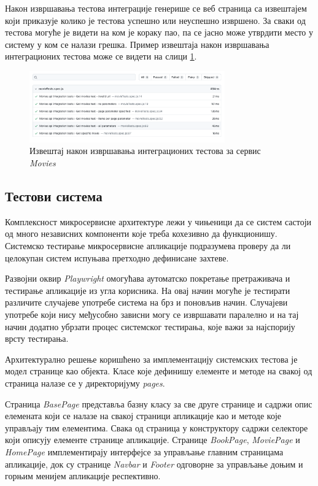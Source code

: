 \documentclass[12pt,oneside]{memoir}
\begin{document}
Након извршавања тестова интеграције генерише се веб страница са извештајем који приказује колико је тестова успешно или неуспешно извршено. За сваки од тестова могуће је видети на ком је кораку пао, па се јасно може утврдити место у систему у ком се налази грешка. Пример извештаја након извршавања интеграционих тестова може се видети на слици \ref{fig:integrationReport}. 

\begin{figure}[!ht]
  \centering
  \includegraphics[width=0.75\textwidth]{matfmaster/img/integrationReport.png}
  \caption{Извештај након извршавања интеграционих тестова за сервис \textit{Movies}}
  \label{fig:integrationReport}
\end{figure}
\newpage
\subsection{Тестови система}

Комплексност микросервисне архитектуре лежи у чињеници да се систем састоји од много независних компоненти које треба кохезивно да функционишу. Системско тестирање микросервисне апликације подразумева проверу да ли целокупан систем испуњава претходно дефинисане захтеве.

Развојни оквир \textit{Playwright} омогућава аутоматско покретање претраживача и тестирање апликације из угла корисника. На овај начин могуће је тестирати различите случајеве употребе система на брз и поновљив начин. Случајеви употребе који нису међусобно зависни могу се извршавати паралелно и на тај начин додатно убрзати процес системског тестирања, које важи за најспорију врсту тестирања.

Архитектурално решење коришћено за имплементацију системских тестова  је модел странице као објекта. Класе које дефинишу елементе и методе на свакој од страница налазе се у директоријуму \textit{pages}. 

Страница \textit{BasePage} представља базну класу за све друге странице и садржи опис елемената који се налазе на свакој страници апликације као и методе које управљају тим елементима.  Свака од страница у конструктору садржи селекторе који описују елементе странице апликације. Странице \textit{BookPage}, \textit{MoviePage} и \textit{HomePage} имплементирају интерфејсе за управљање главним страницама апликације, док су странице \textit{Navbar} и \textit{Footer} одговорне за управљање доњим и горњим менијем апликације респективно.
\end{document}
